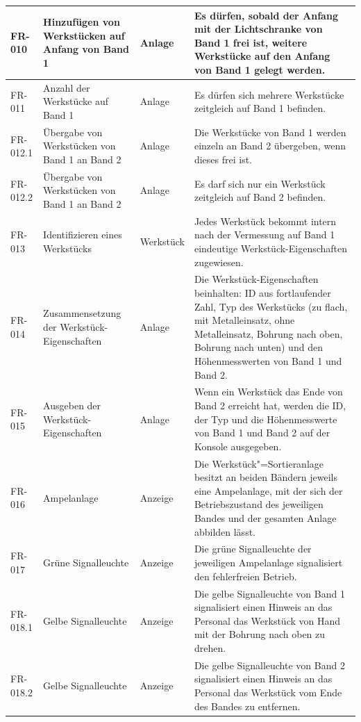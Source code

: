 \documentclass[oneside,a4paper,titlepage]{scrartcl} %
\begin{document}
\begin{small}
\begin{longtable}{|C{2cm}|L{4cm}|C{1.5cm}|L{5.5cm}|}
  \hline
   FR-010 & Hinzufügen von Werkstücken auf Anfang von Band 1 & Anlage & Es dürfen, sobald der Anfang mit der Lichtschranke von Band 1 frei ist, weitere Werkstücke auf den Anfang von Band 1 gelegt werden.\\
  \hline
  FR-011 & Anzahl der Werkstücke auf Band 1 & Anlage & Es dürfen sich mehrere Werkstücke zeitgleich auf Band 1 befinden.\\
  \hline
   FR-012.1 & Übergabe von Werkstücken von Band 1 an Band 2 & Anlage & Die Werkstücke von Band 1 werden einzeln an Band 2 übergeben, wenn dieses frei ist.\\
  \hline
   FR-012.2 & Übergabe von Werkstücken von Band 1 an Band 2 & Anlage & Es darf sich nur ein Werkstück zeitgleich auf Band 2 befinden.\\
  \hline
  FR-013 & Identifizieren eines Werkstücks & Werkstück & Jedes Werkstück bekommt intern nach der Vermessung auf Band 1 eindeutige Werkstück-Eigenschaften zugewiesen.\\
  \hline
   FR-014 & Zusammensetzung der Werkstück-Eigenschaften & Anlage & Die Werkstück-Eigenschaften beinhalten: ID aus fortlaufender Zahl, Typ des Werkstücks (zu flach, mit Metalleinsatz, ohne Metalleinsatz, Bohrung nach oben, Bohrung nach unten) und den Höhenmesswerten von Band 1 und Band 2.\\
  \hline
  FR-015 & Ausgeben der Werkstück-Eigenschaften & Anlage & Wenn ein Werkstück das Ende von Band 2 erreicht hat, werden die ID, der Typ und die Höhenmesswerte von Band 1 und Band 2 auf der Konsole ausgegeben.\\
  \hline
   FR-016 & Ampelanlage & Anzeige & Die Werkstück"=Sortieranlage besitzt an beiden Bändern jeweils eine Ampelanlage, mit der sich der Betriebszustand des jeweiligen Bandes und der gesamten Anlage abbilden lässt.\\
  \hline
  FR-017 & Grüne Signalleuchte & Anzeige & Die grüne Signalleuchte der jeweiligen Ampelanlage signalisiert den fehlerfreien Betrieb.\\
  \hline
   FR-018.1 & Gelbe Signalleuchte & Anzeige & Die gelbe Signalleuchte von Band 1 signalisiert einen Hinweis an das Personal das Werkstück von Hand mit der Bohrung nach oben zu drehen.\\
  \hline
   FR-018.2 & Gelbe Signalleuchte & Anzeige & Die gelbe Signalleuchte von Band 2 signalisiert einen Hinweis an das Personal das Werkstück vom Ende des Bandes zu entfernen.\\

\end{longtable}
\end{small}
\end{document}
